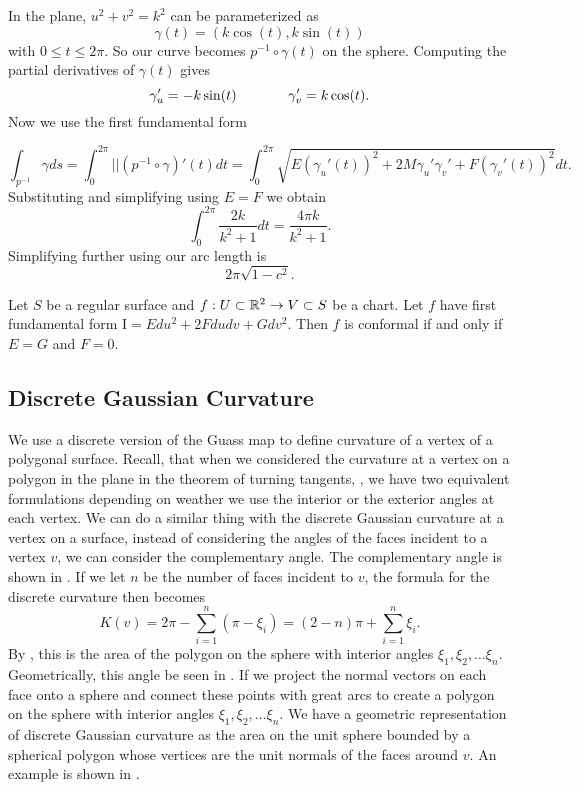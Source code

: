 \begin{example}
In the plane, $u^2+v^2=k^2$ can be parameterized
as $$\gamma(t)=(k\cos(t),k\sin(t))$$ with $0\leq t\leq 2\pi.$
So our curve becomes $p^{-1}\circ \gamma(t)$ on the sphere.
Computing the partial derivatives of $\gamma(t)$ gives
$$\gamma_u'=-k\sin(t)\hspace{1.3cm}  \gamma_v'=k\cos(t).$$
Now we use the first fundamental form

$$\int_{p^{-1}}\gamma ds=\int_{0}^{2\pi} ||(p^{-1}\circ \gamma)'(t)dt=\int_0^{2\pi}\sqrt{E(\gamma_u'(t))^2+2M\gamma_u'\gamma_v'+
F(\gamma_v'(t))^2}dt.$$
Substituting and simplifying using $E=F$ we obtain
$$\int_0^{2\pi}\frac{2k}{k^2+1}dt=\frac{4\pi k}{k^2+1}.$$
Simplifying further using   our arc length is
$$2\pi\sqrt{1-c^2}.$$

\end{example}



\begin{theorem}\label{thm:first-conformal}
	Let $S$ be a regular surface and $f:U\subset \mathbb{R}^2 \to V\subset S$ be a chart.
	Let $f$ have first fundamental form $\mathrm{I}=Edu^2+2Fdudv +Gdv^2$.
	Then $f$ is conformal if and only if $E=G$ and $F=0.$
\end{theorem}

\subsection{Discrete Gaussian Curvature}
\label{sec:discrete}


We use a discrete version of the Guass map to define curvature
of a vertex of a polygonal surface.
Recall, that when we considered the curvature at a vertex on a polygon in the plane
in the theorem of turning tangents, , we have two equivalent
formulations depending on
weather we use the interior or the exterior angles at each vertex.
We can do a similar thing with the discrete Gaussian curvature at a vertex on a surface,
instead of considering the angles of the faces incident to a vertex $v$, we can consider
the complementary angle. The complementary angle is shown in . 
If we let $n$ be the number of faces
incident to $v$, the formula for the discrete curvature then becomes
\begin{equation}\label{eqn:discrete-curvature-complement-angle}
K(v)=2\pi - \sum_{i=1}^n (\pi - \xi_i)=(2-n)\pi +\sum_{i=1}^n \xi_i.
\end{equation}
By , this is the area of the polygon on the sphere with interior
angles $\xi_1, \xi_2,\ldots \xi_n.$
Geometrically, this angle be seen in .
If we project the normal vectors on each face onto a sphere and
connect these points with great arcs to create a polygon on the sphere with interior angles
$\xi_1, \xi_2,\ldots \xi_n.$
We have a geometric representation of discrete
Gaussian curvature as the area on the unit 
sphere bounded by a spherical polygon whose vertices are the unit normals of 
the faces around $v$. An example is shown in .

